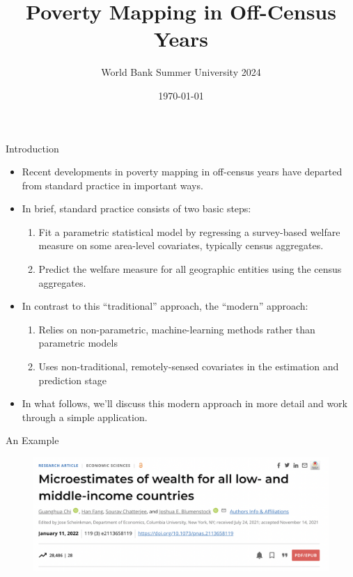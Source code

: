 \documentclass[aspectratio=169, xcolor=dvipsnames]{beamer}
\title[]{Poverty Mapping in Off-Census Years}
\date{\today}
\author[]{World Bank Summer University 2024}
\begin{document}

\begin{frame}
\titlepage
\end{frame}

\begin{frame}{Introduction}
\begin{itemize}
\item Recent developments in poverty mapping in off-census years have
departed from standard practice in important ways.
\item In brief, standard practice consists of two basic steps:
\begin{enumerate}
\item Fit a parametric statistical model by regressing a survey-based 
welfare measure on some area-level covariates, typically census aggregates.
\item Predict the welfare measure for all geographic entities using the census
aggregates.
\end{enumerate}
\item In contrast to this ``traditional'' approach, the ``modern'' approach:
\begin{enumerate}
\item Relies on non-parametric, machine-learning methods rather than 
parametric models
\item Uses non-traditional, remotely-sensed covariates in the estimation and
prediction stage
\end{enumerate}
\item In what follows, we'll discuss this modern approach in more detail and 
work through a simple application.
\end{itemize}
\end{frame}

\begin{frame}{An Example}
\begin{figure}[h!]
  \centering
  \includegraphics[width=0.8 \textwidth]{Chi_1}
\end{figure}
\end{frame}
\end{document}
